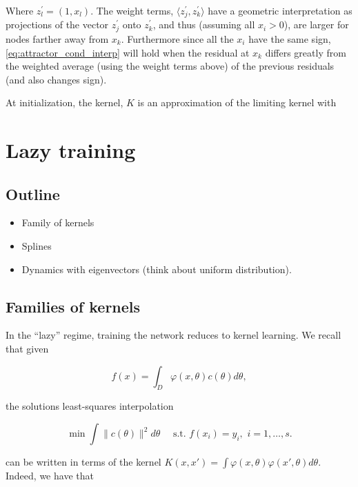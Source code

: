 Where $z^\prime_l = (1, x_l)$. The weight terms, $\langle z^\prime_j, z^\prime_k \rangle$ have a geometric interpretation as projections of the vector $z^\prime_j$ onto $z^\prime_k$, and thus (assuming all $x_i > 0$), are larger for nodes farther away from $x_k$. Furthermore since all the $x_i$ have the same sign, \eqref{eq:attractor_cond_interp} will hold when the residual at $x_k$ differs greatly from the weighted average (using the weight terms above) of the previous residuals (and also changes sign). 

At initialization, the kernel, $K$ is an approximation of the limiting kernel with 
\fi


\section{Lazy training}
\subsection{Outline}
\begin{itemize}
    \item Family of kernels 
    \item Splines
    \item Dynamics with eigenvectors (think about uniform distribution).
\end{itemize}

\subsection{Families of kernels}

In the ``lazy'' regime, training the network reduces to kernel learning. We recall that given

\begin{equation}
f(x) = \int_D \varphi(x,\theta) c(\theta) d\theta,
\end{equation}

the solutions least-squares interpolation

\begin{equation}\label{eq:4-1-min}
\min \int \|c(\theta)\|^2 d\theta \quad \mbox{ s.t. } f(x_i) = y_i, \,\, i=1,\ldots,s.
\end{equation}

can be written in terms of the kernel $K(x,x') = \int \varphi(x,\theta) \varphi(x',\theta) d\theta$. Indeed, we have that 

